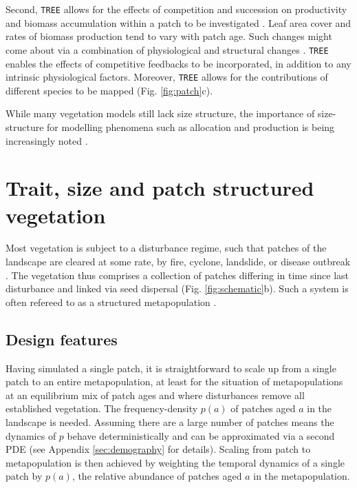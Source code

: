 \documentclass[a4paper,11pt]{article}
\begin{document}
Second, \texttt{TREE} allows for the effects of competition and succession on
productivity and biomass accumulation within a patch to be investigated
\citep{Falster-2011}. Leaf area cover and rates of biomass production
tend to vary with patch age. Such changes might come about via a
combination of physiological and structural changes
\citep{Binkley-2002, Smith-2001, Ogawa-2010, Coomes-2007}. \texttt{TREE} enables
the effects of competitive feedbacks to be incorporated, in addition to
any intrinsic physiological factors. Moreover, \texttt{TREE} allows for the
contributions of different species to be mapped (Fig. \ref{fig:patch}c).

While many vegetation models still lack size structure, the importance of
size-structure for modelling phenomena such as allocation and production is
being increasingly noted \citep{Moorcroft-2001, Dekauwe-2014, Falster-2011}.

\section{Trait, size and patch structured vegetation}

Most vegetation is subject to a disturbance regime, such that patches of
the landscape are cleared at some rate, by fire, cyclone, landslide, or
disease outbreak
\citep{Connell-1978, White-1979, Chambers-2013, Bormann-1979, Clark-1991, Coomes-2007}.
The vegetation thus comprises a collection of patches differing in time
since last disturbance and linked via seed dispersal (Fig.
\ref{fig:schematic}b). Such a system is often refereed to as a
structured metapopulation \citep{Gyllenberg-2001}.

\subsection{Design features}

Having simulated a single patch, it is straightforward to scale up from
a single patch to an entire metapopulation, at least for the situation
of metapopulations at an equilibrium mix of patch ages and where
disturbances remove all established vegetation. The frequency-density
\(p(a)\) of patches aged \(a\) in the landscape is needed. Assuming there
are a large number of patches means the dynamics of \(p\) behave
deterministically and can be approximated via a second PDE
\citep{Vonfoerster-1959, Mckendrick-1926} (see Appendix
\ref{sec:demography} for
details). Scaling from patch to metapopulation is then achieved by
weighting the temporal dynamics of a single patch by \(p(a)\), the
relative abundance of patches aged \(a\) in the metapopulation.
\end{document}
